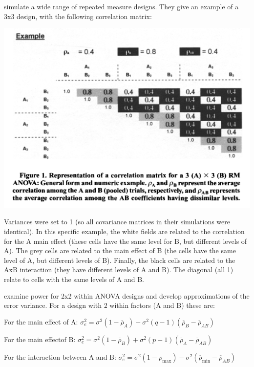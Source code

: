 \documentclass[]{book}
\begin{document}
\citet{potvin2000statistical} simulate a wide range of repeated measure designs. They give an example of a 3x3 design, with the following correlation matrix:

\includegraphics{screenshots/PS2000.png}

Variances were set to 1 (so all covariance matrices in their simulations were identical). In this specific example, the white fields are related to the correlation for the A main effect (these cells have the same level for B, but different levels of A). The grey cells are related to the main effect of B (the cells have the same level of A, but different levels of B). Finally, the black cells are related to the AxB interaction (they have different levels of A and B). The diagonal (all 1) relate to cells with the same levels of A and B.

\citet{potvin2000statistical} examine power for 2x2 within ANOVA designs and develop approximations of the error variance. For a design with 2 within factors (A and B) these are:

For the main effect of A:
\(\sigma _ { e } ^ { 2 } = \sigma ^ { 2 } ( 1 - \overline { \rho } _ { A } ) + \sigma ^ { 2 } ( q - 1 ) ( \overline { \rho } _ { B } - \overline { \rho } _ { AB } )\)

For the main effectof B:
\(\sigma _ { e } ^ { 2 } = \sigma ^ { 2 } ( 1 - \overline { \rho } _ { B } ) + \sigma ^ { 2 } ( p - 1 ) ( \overline { \rho } _ { A } - \overline { \rho } _ { A B } )\)

For the interaction between A and B:
\(\sigma _ { e } ^ { 2 } = \sigma ^ { 2 } ( 1 - \rho _ { \max } ) - \sigma ^ { 2 } ( \overline { \rho } _ { \min } - \overline { \rho } _ { AB } )\)
\end{document}
